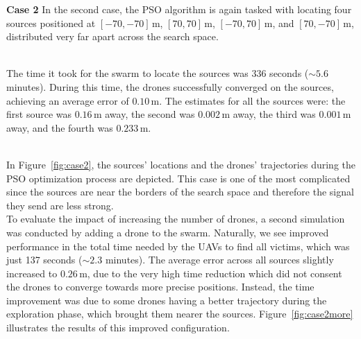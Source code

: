 \documentclass[main]{subfiles}
\begin{document}
\textbf{Case 2}
In the second case, the PSO algorithm is again tasked with locating four 
sources positioned at \([-70, -70] \, \text{m}\), \([70, 70] \, \text{m}\), \([-70, 70] \, \text{m}\), and \([70, -70] \, \text{m}\), 
distributed very far apart across the search space.

\noindent\\
The time it took for the swarm to locate the sources was 336 seconds (\(\sim 5.6\) minutes). 
During this time, 
the drones successfully converged on the sources, achieving an average error of \(0.10 \, \text{m}\). 
The estimates for all the sources were: the first source was \(0.16 \, \text{m}\) away, 
the second was \(0.002 \, \text{m}\) away, the third was \(0.001 \, \text{m}\) away, 
and the fourth was \(0.233 \, \text{m}\). 

\noindent\\
In Figure~\ref{fig:case2}, the sources' locations and the drones' 
trajectories during the PSO optimization process are depicted. 
This case is one of the most complicated since the sources are near
the borders of the search space and therefore
the signal they send are less strong.
\noindent\\
To evaluate the impact of increasing the number of drones, a second simulation 
was conducted by adding a drone to the swarm. 
Naturally, we see improved performance in the total time
needed by the UAVs to find all victims, which was just 137 seconds (\(\sim 2.3\) minutes).
The average error across all sources slightly increased to \(0.26 \, \text{m}\),
due to the very high time reduction which did not consent the drones
to converge towards more precise positions. 
Instead, the time improvement was due to some drones 
having a better trajectory during the exploration phase, which brought 
them nearer the sources.
Figure~\ref{fig:case2more} illustrates the results of this improved configuration. 
\end{document}
